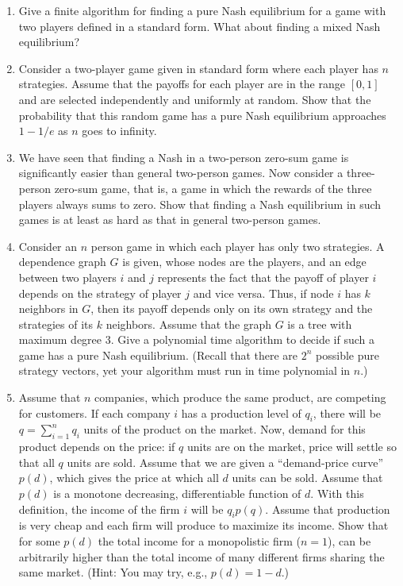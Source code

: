 \documentclass{article}
\theoremstyle{definition}
\begin{document}
\begin{enumerate}

\item
Give a finite algorithm for finding a pure Nash equilibrium for a game with two players
defined in a standard form.
What about finding a mixed Nash equilibrium?

\item
Consider a two-player game given in standard form where each player has $n$ strategies.
Assume that the payoffs for each player are in the range $[0, 1]$ and are selected
independently and uniformly at random. Show that the probability that this random
game has a pure Nash equilibrium approaches $1 - 1/e$ as $n$ goes to infinity.

\item
We have seen that finding a Nash in a two-person zero-sum game is significantly
easier than general two-person games. Now consider a three-person zero-sum game,
that is, a game in which the rewards of the three players always sums to zero. Show
that finding a Nash equilibrium in such games is at least as hard as that in general
two-person games.

\item
Consider an $n$ person game in which each player has only two strategies.
A dependence graph $G$ is given, whose nodes are the players, and an edge between two
players $i$ and $j$ represents the fact that the payoff of player $i$ depends on the strategy
of player $j$ and vice versa. Thus, if node $i$ has $k$ neighbors in $G$,
then its payoff depends only on its own strategy and the strategies of its $k$ neighbors.
Assume that the graph $G$ is a tree with maximum degree 3.
Give a polynomial time algorithm to decide if such a game has a pure Nash
equilibrium.
(Recall that there are $2^n$ possible pure strategy vectors, yet your algorithm
must run in time polynomial in $n$.)

\item
Assume that $n$ companies, which produce the same product, are competing for
customers. If each company $i$ has a production level of $q_i$,
there will be $q = \sum_{i=1}^n q_i$ units of the product on the market.
Now, demand for this product depends on the price: if $q$ units are on the
market, price will settle so that all $q$ units are sold.
Assume that we are given a ``demand-price curve'' $p(d)$,
which gives the price at which all $d$ units can be sold.
Assume that $p(d)$ is a monotone decreasing, differentiable function of $d$.
With this definition, the income of the firm $i$ will be $q_i p(q)$.
Assume that production is very cheap and each firm will produce to maximize its income.
Show that for some $p(d)$ the total income for a monopolistic firm ($n=1$),
can be arbitrarily higher than the total income of many different firms sharing
the same market.
(Hint: You may try, e.g., $p(d) = 1 - d$.)

\end{enumerate}
\end{document}
